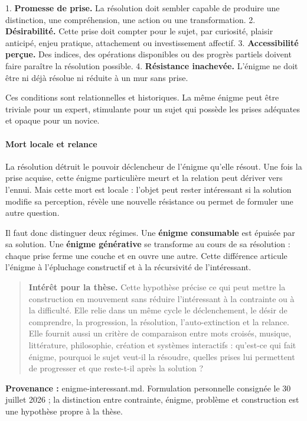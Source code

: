 \documentclass[10pt,a4paper]{article}
\begin{document}
1. \textbf{Promesse de prise.} La résolution doit sembler capable de produire une    distinction, une compréhension, une action ou une transformation. 2. \textbf{Désirabilité.} Cette prise doit compter pour le sujet, par curiosité,    plaisir anticipé, enjeu pratique, attachement ou investissement affectif. 3. \textbf{Accessibilité perçue.} Des indices, des opérations disponibles ou des    progrès partiels doivent faire paraître la résolution possible. 4. \textbf{Résistance inachevée.} L'énigme ne doit être ni déjà résolue ni réduite à    un mur sans prise.

Ces conditions sont relationnelles et historiques. La même énigme peut être triviale pour un expert, stimulante pour un sujet qui possède les prises adéquates et opaque pour un novice.

\paragraph{Mort locale et relance}
La résolution détruit le pouvoir déclencheur de l'énigme qu'elle résout. Une fois la prise acquise, cette énigme particulière meurt et la relation peut dériver vers l'ennui. Mais cette mort est locale : l'objet peut rester intéressant si la solution modifie sa perception, révèle une nouvelle résistance ou permet de formuler une autre question.

Il faut donc distinguer deux régimes. Une \textbf{énigme consumable} est épuisée par sa solution. Une \textbf{énigme générative} se transforme au cours de sa résolution : chaque prise ferme une couche et en ouvre une autre. Cette différence articule l'énigme à l'épluchage constructif et à la récursivité de l'intéressant.

\begin{quote}
\textbf{Intérêt pour la thèse.} Cette hypothèse précise ce qui peut mettre la construction en mouvement sans réduire l'intéressant à la contrainte ou à la difficulté. Elle relie dans un même cycle le déclenchement, le désir de comprendre, la progression, la résolution, l'auto-extinction et la relance. Elle fournit aussi un critère de comparaison entre mots croisés, musique, littérature, philosophie, création et systèmes interactifs : qu'est-ce qui fait énigme, pourquoi le sujet veut-il la résoudre, quelles prises lui permettent de progresser et que reste-t-il après la solution ?
\end{quote}
{\footnotesize\color{metadata}\textbf{Provenance :} enigme-interessant.md. Formulation personnelle consignée le 30 juillet 2026 ; la distinction entre contrainte, énigme, problème et construction est une hypothèse propre à la thèse.\par}
\end{document}
